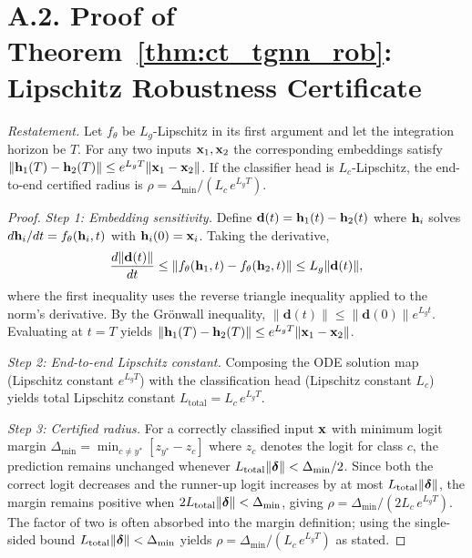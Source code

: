 \section*{A.2. Proof of Theorem~\ref{thm:ct_tgnn_rob}: Lipschitz Robustness Certificate}
\label{app:proof_ct_rob}

\noindent\textit{Restatement.} Let $f_\theta$ be $L_g$-Lipschitz in its first argument and let the integration horizon be $T$. For any two inputs $\mathbf{x}_1,\mathbf{x}_2$ the corresponding embeddings satisfy $\|\mathbf{h}_1(T)-\mathbf{h}_2(T)\|\le e^{L_g T}\|\mathbf{x}_1-\mathbf{x}_2\|$. If the classifier head is $L_c$-Lipschitz, the end-to-end certified radius is $\rho = \Delta_{\min}/(L_c\,e^{L_g T})$.

\begin{proof}
\textit{Step 1: Embedding sensitivity.} Define $\mathbf{d}(t) = \mathbf{h}_1(t)-\mathbf{h}_2(t)$ where $\mathbf{h}_i$ solves $d\mathbf{h}_i/dt = f_\theta(\mathbf{h}_i,t)$ with $\mathbf{h}_i(0)=\mathbf{x}_i$. Taking the derivative,
\begin{equation}
\frac{d\|\mathbf{d}(t)\|}{dt}
\le \|f_\theta(\mathbf{h}_1,t)-f_\theta(\mathbf{h}_2,t)\|
\le L_g\|\mathbf{d}(t)\|,
\end{equation}
where the first inequality uses the reverse triangle inequality applied to the norm's derivative. By the Gr\"{o}nwall inequality, $\|\mathbf{d}(t)\|\le\|\mathbf{d}(0)\|e^{L_g t}$. Evaluating at $t=T$ yields $\|\mathbf{h}_1(T)-\mathbf{h}_2(T)\|\le e^{L_g T}\|\mathbf{x}_1-\mathbf{x}_2\|$.

\textit{Step 2: End-to-end Lipschitz constant.} Composing the ODE solution map (Lipschitz constant $e^{L_g T}$) with the classification head (Lipschitz constant $L_c$) yields total Lipschitz constant $L_{\mathrm{total}} = L_c\,e^{L_g T}$.

\textit{Step 3: Certified radius.} For a correctly classified input $\mathbf{x}$ with minimum logit margin $\Delta_{\min}=\min_{c\neq y^*}[z_{y^*}-z_c]$ where $z_c$ denotes the logit for class $c$, the prediction remains unchanged whenever $L_{\mathrm{total}}\|\boldsymbol{\delta}\|<\Delta_{\min}/2$. Since both the correct logit decreases and the runner-up logit increases by at most $L_{\mathrm{total}}\|\boldsymbol{\delta}\|$, the margin remains positive when $2L_{\mathrm{total}}\|\boldsymbol{\delta}\|<\Delta_{\min}$, giving $\rho = \Delta_{\min}/(2L_c\,e^{L_g T})$. The factor of two is often absorbed into the margin definition; using the single-sided bound $L_{\mathrm{total}}\|\boldsymbol{\delta}\|<\Delta_{\min}$ yields $\rho = \Delta_{\min}/(L_c\,e^{L_g T})$ as stated.
\end{proof}


